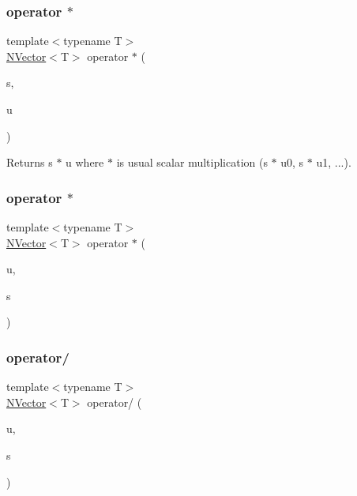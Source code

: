 \subsubsection{\texorpdfstring{operator $\ast$}{operator *}\hspace{0.1cm}{\footnotesize\ttfamily [1/2]}}
{\footnotesize\ttfamily template$<$typename T$>$ \\
\mbox{\hyperlink{class_n_vector}{N\+Vector}}$<$T$>$ operator $\ast$ (\begin{DoxyParamCaption}\item[{T}]{s,  }\item[{\mbox{\hyperlink{class_n_vector}{N\+Vector}}$<$ T $>$}]{u }\end{DoxyParamCaption})\hspace{0.3cm}{\ttfamily [friend]}}

\begin{DoxyReturn}{Returns}
s $\ast$ u where $\ast$ is usual scalar multiplication (s $\ast$ u0, s $\ast$ u1, ...). 
\end{DoxyReturn}
\mbox{\label{class_n_vector_ab1ec596666b587300410f8fa459f295d}} 
\subsubsection{\texorpdfstring{operator $\ast$}{operator *}\hspace{0.1cm}{\footnotesize\ttfamily [2/2]}}
{\footnotesize\ttfamily template$<$typename T$>$ \\
\mbox{\hyperlink{class_n_vector}{N\+Vector}}$<$T$>$ operator $\ast$ (\begin{DoxyParamCaption}\item[{const \mbox{\hyperlink{class_n_vector}{N\+Vector}}$<$ T $>$ \&}]{u,  }\item[{T}]{s }\end{DoxyParamCaption})\hspace{0.3cm}{\ttfamily [friend]}}

\mbox{\label{class_n_vector_a56643335b5a0b0b07abe89e2cac8a5de}} 
\subsubsection{\texorpdfstring{operator/}{operator/}\hspace{0.1cm}{\footnotesize\ttfamily [1/2]}}
{\footnotesize\ttfamily template$<$typename T$>$ \\
\mbox{\hyperlink{class_n_vector}{N\+Vector}}$<$T$>$ operator/ (\begin{DoxyParamCaption}\item[{\mbox{\hyperlink{class_n_vector}{N\+Vector}}$<$ T $>$}]{u,  }\item[{T}]{s }\end{DoxyParamCaption})\hspace{0.3cm}{\ttfamily [friend]}}

